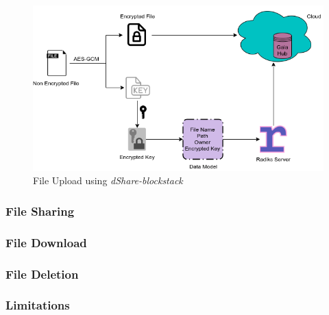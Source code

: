 			\begin{figure}[h]
				\includegraphics[width=\linewidth]{figures/blockstack-upload}
				\caption{\label{fig:blockstack-upload} File Upload using \textit{dShare-blockstack}}
			\end{figure}
			
			\subsubsection{File Sharing}
			
			\subsubsection{File Download}
			
			\subsubsection{File Deletion}
			
			\subsubsection{Limitations}